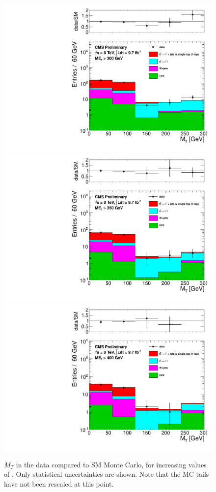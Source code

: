 \begin{figure}[hbt]
  \begin{center}
        \includegraphics[width=0.5\linewidth]{plots/mt_met300_emucomb.pdf}%
        \includegraphics[width=0.5\linewidth]{plots/mt_met350_emucomb.pdf}
        \includegraphics[width=0.5\linewidth]{plots/mt_met400_emucomb.pdf}
    \caption{$M_T$ in the data compared to SM Monte Carlo, for
      increasing values of \met. Only statistical uncertainties are
      shown. Note that the MC tails have not
      been rescaled at this point.
\label{fig:mtsig2}
}  
      \end{center}
\end{figure}


\clearpage
